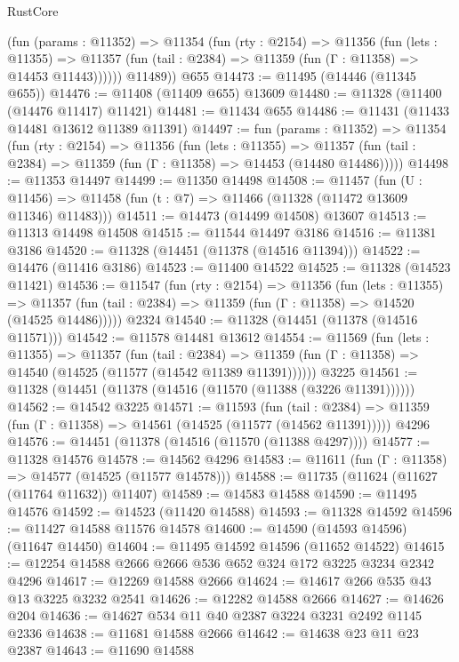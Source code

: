 \begin{lexlean}{RustCore}
\begin{coremodule}
          (fun (params : @11352) =>
          @11354
            (fun (rty : @2154) =>
            @11356
              (fun (lets : @11355) =>
              @11357 (fun (tail : @2384) => @11359 (fun (Γ : @11358) => @14453 @11443))))))
        @11489))
    @655
@14473 := @11495 (@14446 (@11345 @655))
@14476 := @11408 (@11409 @655) @13609
@14480 := @11328 (@11400 (@14476 @11417) @11421)
@14481 := @11434 @655
@14486 := @11431 (@11433 @14481 @13612 @11389 @11391)
@14497 := fun (params : @11352) =>
  @11354
    (fun (rty : @2154) =>
    @11356
      (fun (lets : @11355) =>
      @11357 (fun (tail : @2384) => @11359 (fun (Γ : @11358) => @14453 (@14480 @14486)))))
@14498 := @11353 @14497
@14499 := @11350 @14498
@14508 := @11457
    (fun (U : @11456) => @11458 (fun (t : @7) => @11466 (@11328 (@11472 @13609 @11346) @11483)))
@14511 := @14473 (@14499 @14508) @13607
@14513 := @11313 @14498 @14508
@14515 := @11544 @14497 @3186
@14516 := @11381 @3186
@14520 := @11328 (@14451 (@11378 (@14516 @11394)))
@14522 := @14476 (@11416 @3186)
@14523 := @11400 @14522
@14525 := @11328 (@14523 @11421)
@14536 := @11547
    (fun (rty : @2154) =>
    @11356
      (fun (lets : @11355) =>
      @11357 (fun (tail : @2384) => @11359 (fun (Γ : @11358) => @14520 (@14525 @14486)))))
    @2324
@14540 := @11328 (@14451 (@11378 (@14516 @11571)))
@14542 := @11578 @14481 @13612
@14554 := @11569
    (fun (lets : @11355) =>
    @11357
      (fun (tail : @2384) =>
      @11359 (fun (Γ : @11358) => @14540 (@14525 (@11577 (@14542 @11389 @11391))))))
    @3225
@14561 := @11328 (@14451 (@11378 (@14516 (@11570 (@11388 (@3226 @11391))))))
@14562 := @14542 @3225
@14571 := @11593
    (fun (tail : @2384) => @11359 (fun (Γ : @11358) => @14561 (@14525 (@11577 (@14562 @11391)))))
    @4296
@14576 := @14451 (@11378 (@14516 (@11570 (@11388 @4297))))
@14577 := @11328 @14576
@14578 := @14562 @4296
@14583 := @11611 (fun (Γ : @11358) => @14577 (@14525 (@11577 @14578)))
@14588 := @11735 (@11624 (@11627 (@11764 @11632)) @11407)
@14589 := @14583 @14588
@14590 := @11495 @14576
@14592 := @14523 (@11420 @14588)
@14593 := @11328 @14592
@14596 := @11427 @14588 @11576 @14578
@14600 := @14590 (@14593 @14596) (@11647 @14450)
@14604 := @11495 @14592 @14596 (@11652 @14522)
@14615 := @12254 @14588 @2666 @2666 @536 @652 @324 @172 @3225 @3234 @2342 @4296
@14617 := @12269 @14588 @2666
@14624 := @14617 @266 @535 @43 @13 @3225 @3232 @2541
@14626 := @12282 @14588 @2666
@14627 := @14626 @204
@14636 := @14627 @534 @11 @40 @2387 @3224 @3231 @2492 @1145 @2336
@14638 := @11681 @14588 @2666
@14642 := @14638 @23 @11 @23 @2387
@14643 := @11690 @14588

\end{coremodule}
\end{lexlean}

